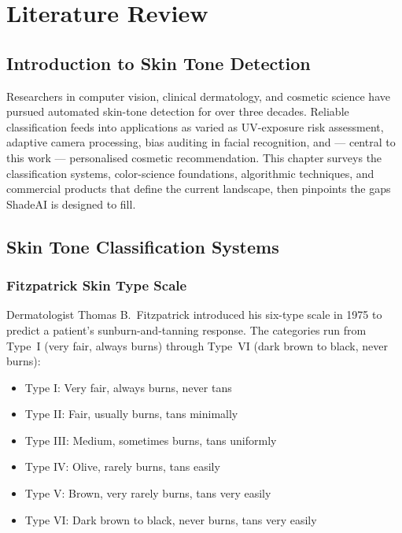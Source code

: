 \chapter{Literature Review}

\section{Introduction to Skin Tone Detection}

Researchers in computer vision, clinical dermatology, and cosmetic science have pursued automated skin-tone detection for over three decades. Reliable classification feeds into applications as varied as UV-exposure risk assessment, adaptive camera processing, bias auditing in facial recognition, and — central to this work — personalised cosmetic recommendation. This chapter surveys the classification systems, color-science foundations, algorithmic techniques, and commercial products that define the current landscape, then pinpoints the gaps ShadeAI is designed to fill.

\section{Skin Tone Classification Systems}

\subsection{Fitzpatrick Skin Type Scale}

Dermatologist Thomas B.\ Fitzpatrick introduced his six-type scale in 1975 to predict a patient's sunburn-and-tanning response. The categories run from Type~I (very fair, always burns) through Type~VI (dark brown to black, never burns):

\begin{itemize}
    \item Type I: Very fair, always burns, never tans
    \item Type II: Fair, usually burns, tans minimally
    \item Type III: Medium, sometimes burns, tans uniformly
    \item Type IV: Olive, rarely burns, tans easily
    \item Type V: Brown, very rarely burns, tans very easily
    \item Type VI: Dark brown to black, never burns, tans very easily
\end{itemize}


